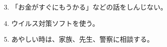 \documentclass[xcolor=dvipsnames, aspectratio=1610]{beamer}
\begin{document}
\begin{frame}{3. 「お金がすぐにもうかる」などの話をしんじない。}
    \begin{figure}[h]
        \centering
    \end{figure}
\end{frame}
\begin{frame}{4. ウイルス対策ソフトを使う。}
    \begin{figure}[h]
        \centering
    \end{figure}
\end{frame}
\begin{frame}{5. あやしい時は、家族、先生、警察に相談する。}
    \begin{figure}[h]
        \centering
    \end{figure}
\end{frame}
\end{document}

